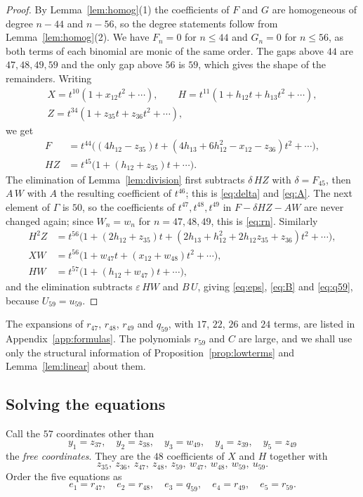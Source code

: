 \documentclass{amsart}
\theoremstyle{definition}
\theoremstyle{remark}
\numberwithin{equation}{section}
\begin{document}
\begin{proof}
By Lemma~\ref{lem:homog}(1) the coefficients of $F$ and $G$ are homogeneous of degree $n-44$ and $n-56$, so the degree statements follow from Lemma~\ref{lem:homog}(2). We have $F_n=0$ for $n\le44$ and $G_n=0$ for $n\le56$, as both terms of each binomial are monic of the same order. The gaps above $44$ are $47,48,49,59$ and the only gap above $56$ is $59$, which gives the shape of the remainders. Writing
\begin{gather*}
X=t^{10}(1+x_{12}t^2+\cdots),\qquad H=t^{11}(1+h_{12}t+h_{13}t^2+\cdots),\\
Z=t^{34}(1+z_{35}t+z_{36}t^2+\cdots),
\end{gather*}
we get
\begin{align*}
F&=t^{44}\bigl((4h_{12}-z_{35})t+(4h_{13}+6h_{12}^2-x_{12}-z_{36})t^2+\cdots\bigr),\\
HZ&=t^{45}\bigl(1+(h_{12}+z_{35})t+\cdots\bigr).
\end{align*}
The elimination of Lemma~\ref{lem:division} first subtracts $\delta\,HZ$ with $\delta=F_{45}$, then $A\,W$ with $A$ the resulting coefficient of $t^{46}$; this is \eqref{eq:delta} and \eqref{eq:A}. The next element of $\Gamma$ is $50$, so the coefficients of $t^{47},t^{48},t^{49}$ in $F-\delta HZ-AW$ are never changed again; since $W_n=w_n$ for $n=47,48,49$, this is \eqref{eq:rn}. Similarly
\begin{align*}
H^2Z&=t^{56}\bigl(1+(2h_{12}+z_{35})t+(2h_{13}+h_{12}^2+2h_{12}z_{35}+z_{36})t^2+\cdots\bigr),\\
XW&=t^{56}\bigl(1+w_{47}t+(x_{12}+w_{48})t^2+\cdots\bigr),\\
HW&=t^{57}\bigl(1+(h_{12}+w_{47})t+\cdots\bigr),
\end{align*}
and the elimination subtracts $\varepsilon\,HW$ and $B\,U$, giving \eqref{eq:eps}, \eqref{eq:B} and \eqref{eq:q59}, because $U_{59}=u_{59}$.
\end{proof}

The expansions of $r_{47}$, $r_{48}$, $r_{49}$ and $q_{59}$, with $17$, $22$, $26$ and $24$ terms, are listed in Appendix~\ref{app:formulas}. The polynomials $r_{59}$ and $C$ are large, and we shall use only the structural information of Proposition~\ref{prop:lowterms} and Lemma~\ref{lem:linear} about them.

\subsection{Solving the equations}
Call the $57$ coordinates other than
\[
y_1=z_{37},\quad y_2=z_{38},\quad y_3=w_{49},\quad y_4=z_{39},\quad y_5=z_{49}
\]
the \emph{free coordinates}. They are the $48$ coefficients of $X$ and $H$ together with
\[
z_{35},\ z_{36},\ z_{47},\ z_{48},\ z_{59},\ w_{47},\ w_{48},\ w_{59},\ u_{59}.
\]
Order the five equations as
\[
e_1=r_{47},\quad e_2=r_{48},\quad e_3=q_{59},\quad e_4=r_{49},\quad e_5=r_{59}.
\]
\end{document}
